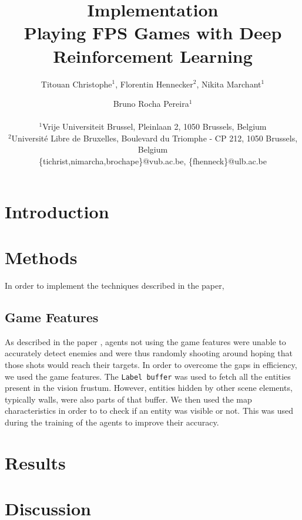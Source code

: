 \documentclass[letterpaper]{article}
\title{Implementation\\Playing FPS Games with Deep Reinforcement Learning}
\author{Titouan Christophe$^{1}$, Florentin Hennecker$^{2}$, Nikita Marchant$^{1}$ \and Bruno Rocha Pereira$^{1}$ \\
\mbox{}\\
$^1$Vrije Universiteit Brussel, Pleinlaan 2, 1050 Brussels, Belgium \\
$^2$Universit\'e Libre de Bruxelles, Boulevard du Triomphe - CP 212, 1050
Brussels, Belgium \\
\{tichrist,nimarcha,brochape\}@vub.ac.be, \{fhenneck\}@ulb.ac.be}
\begin{document}
\maketitle
\begin{abstract}
\end{abstract}

\section{Introduction}

\section{Methods}
In order to implement the techniques described in the paper,\todo{}
\subsection{Game Features}
As described in the paper \citep{Kempka2016ViZDoom}, agents not using the game features were unable to accurately detect enemies and were thus randomly shooting around hoping that those shots would reach their targets. In order to overcome the gaps in efficiency, we used the game features. The \texttt{Label buffer} was used to fetch all the entities present in the vision frustum. However, entities hidden by other scene elements, typically walls, were also parts of that buffer. We then used the map characteristics in order to to check if an entity was visible or not. This was used during the training of the agents to improve their accuracy.

\section{Results}

\section{Discussion}


\footnotesize


\end{document}
